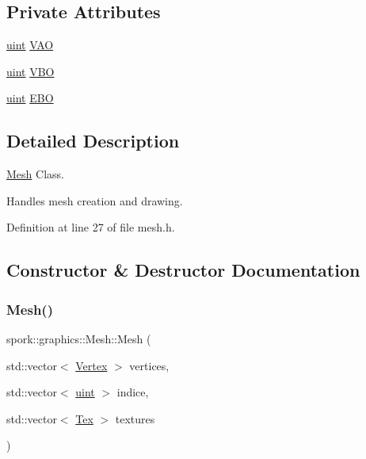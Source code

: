 \subsection*{Private Attributes}
\begin{DoxyCompactItemize}
\item 
\hyperlink{defines_8h_a91ad9478d81a7aaf2593e8d9c3d06a14}{uint} \hyperlink{classspork_1_1graphics_1_1_mesh_a36ed157960b32e7b6a2dd1b42a3a4022}{V\+AO}
\item 
\hyperlink{defines_8h_a91ad9478d81a7aaf2593e8d9c3d06a14}{uint} \hyperlink{classspork_1_1graphics_1_1_mesh_af042cedf11857eabbd50810967702b85}{V\+BO}
\item 
\hyperlink{defines_8h_a91ad9478d81a7aaf2593e8d9c3d06a14}{uint} \hyperlink{classspork_1_1graphics_1_1_mesh_a96fbfb27eb4482b87b48e77567df41f7}{E\+BO}
\end{DoxyCompactItemize}


\subsection{Detailed Description}
\hyperlink{classspork_1_1graphics_1_1_mesh}{Mesh} Class. 

Handles mesh creation and drawing. 

Definition at line 27 of file mesh.\+h.



\subsection{Constructor \& Destructor Documentation}
\mbox{\label{classspork_1_1graphics_1_1_mesh_a72d87fa982dcad754e9993457a95724b}} 
\subsubsection{\texorpdfstring{Mesh()}{Mesh()}}
{\footnotesize\ttfamily spork\+::graphics\+::\+Mesh\+::\+Mesh (\begin{DoxyParamCaption}\item[{std\+::vector$<$ \hyperlink{structspork_1_1graphics_1_1_vertex}{Vertex} $>$}]{vertices,  }\item[{std\+::vector$<$ \hyperlink{defines_8h_a91ad9478d81a7aaf2593e8d9c3d06a14}{uint} $>$}]{indice,  }\item[{std\+::vector$<$ \hyperlink{structspork_1_1graphics_1_1_tex}{Tex} $>$}]{textures }\end{DoxyParamCaption})}



